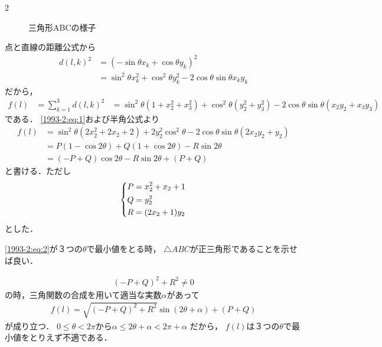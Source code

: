 \documentclass[../../../../main.tex]{subfiles}
\begin{document}
\begin{multicols}{2}
\begin{figure}[H]
    \caption{三角形ABCの様子}
    \label{1993-2:fig:1}
  \end{figure}


  点と直線の距離公式から
  \begin{align*}
    d(l,k)^2
     & = (-\sin\theta x_k+\cos\theta y_k)^2                                  \\
     & = \sin^2\theta x_k^2+\cos^2\theta y_k^2-2\cos\theta \sin\theta x_ky_k
  \end{align*}
  だから，
  \begin{align*}
    f(l)
     & = \sum_{k=1}^3 d(l,k)^2
     & = \sin^2\theta(1+x_2^2+x_3^2) + \cos^2\theta (y_2^2+y_3^2) - 2\cos\theta\sin\theta (x_2y_2+x_3y_3)
  \end{align*}
  である．
  \cref{1993-2:eq:1}および半角公式より
  \begin{align}
    f(l)
     & = \sin^2\theta (2x_2^2+2x_2+2) + 2y_2^2\cos^2\theta - 2\cos\theta\sin\theta(2x_2y_2+y_2) \\
     & = P(1-\cos2\theta) + Q(1+\cos2\theta) - R\sin2\theta                                     \\
     & = (-P+Q)\cos2\theta - R\sin2\theta + (P+Q) \label{1993-2:eq:2}
  \end{align}
  と書ける．ただし
  \begin{align}
    \begin{dcases}
      P=x_2^2+x_2+1 \\
      Q=y_2^2       \\
      R=(2x_2+1)y_2
    \end{dcases} \label{1993-2:eq:3}
  \end{align}
  とした．

  \cref{1993-2:eq:2}が３つの$\theta$で最小値をとる時，
  $\triangle ABC$が正三角形であることを示せば良い．

  \begin{align*}
    (-P+Q)^2+R^2 \neq 0
  \end{align*}
  の時，三角関数の合成を用いて適当な実数$\alpha$があって
  \begin{align*}
    f(l) = \sqrt{(-P+Q)^2+R^2} \sin(2\theta+\alpha) + (P+Q)
  \end{align*}
  が成り立つ．
  $0 \le \theta < 2\pi$から$\alpha \le 2\theta+\alpha < 2\pi+\alpha$ だから，
  $f(l)$は３つの$\theta$で最小値をとりえず不適である．


\end{multicols}
\end{document}
